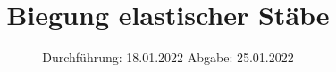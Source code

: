 

\subject{VERSUCH 107}
\title{Biegung elastischer Stäbe}
\date{%
  Durchführung: 18.01.2022
  \hspace{3em}
  Abgabe: 25.01.2022
}



\maketitle
\thispagestyle{empty}
\tableofcontents
\newpage






\printbibliography{}


